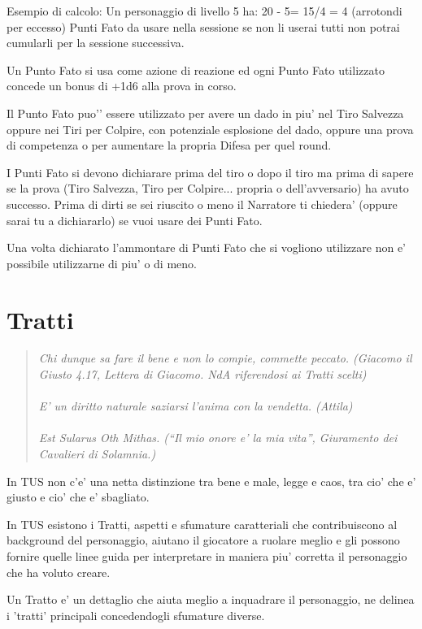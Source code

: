 \documentclass[a4paper,11pt,twoside,openany]{book}
\begin{document}
Esempio di calcolo:
Un personaggio di livello 5 ha: 20 - 5= 15/4 = 4 (arrotondi per eccesso) Punti Fato da usare nella sessione se non li userai tutti non potrai cumularli per la sessione successiva.

Un Punto Fato si usa come azione di reazione ed ogni Punto Fato utilizzato concede un bonus di +1d6 alla prova in corso. 

Il Punto Fato puo'’ essere utilizzato per avere un dado in piu' nel Tiro Salvezza oppure nei Tiri per Colpire, con potenziale esplosione del dado, oppure una prova di competenza o per aumentare la propria Difesa per quel round.

I Punti Fato si devono dichiarare prima del tiro o dopo il tiro ma prima di sapere se la prova (Tiro Salvezza, Tiro per Colpire... propria o dell’avversario) ha avuto successo. 
Prima di dirti se sei riuscito o meno il Narratore ti chiedera’ (oppure sarai tu a dichiararlo) se vuoi usare dei Punti Fato.

Una volta dichiarato l’ammontare di Punti Fato che si vogliono utilizzare non e’ possibile utilizzarne di piu' o di meno.

\section{Tratti}

\label{tratti}
\begin{quote}\textit{
Chi dunque sa fare il bene e non lo compie, commette peccato. (Giacomo il Giusto 4.17, Lettera di Giacomo. NdA riferendosi ai Tratti scelti)\\\\
E' un diritto naturale saziarsi l'anima con la vendetta. (Attila)\\\\
Est Sularus Oth Mithas. (“Il mio onore e' la mia vita”, Giuramento dei Cavalieri di Solamnia.)}\end{quote}

In TUS non c'e' una netta distinzione tra bene e male, legge e caos, tra cio' che e' giusto e cio' che e' sbagliato.

In TUS esistono i Tratti, aspetti e sfumature caratteriali che contribuiscono al background del personaggio, aiutano il giocatore a ruolare meglio e gli possono fornire quelle linee guida per interpretare in maniera piu' corretta il personaggio che ha voluto creare.

Un Tratto e' un dettaglio che aiuta meglio a inquadrare il personaggio, ne delinea i 'tratti' principali concedendogli sfumature diverse.
\end{document}
